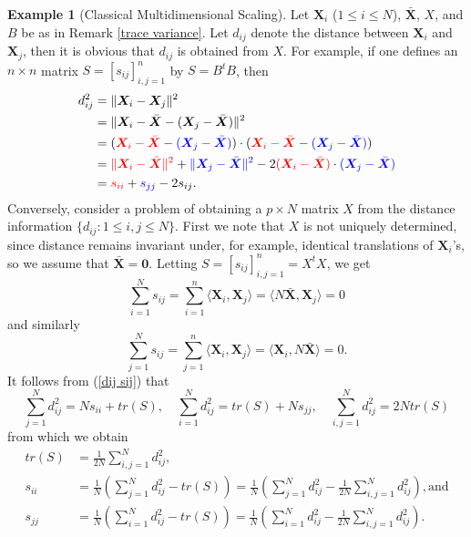 \documentclass[12pt,letterpaper]{book}
\def\red{\textcolor{red}}
\def\blue{\textcolor{blue}}
\numberwithin{equation}{section}
\theoremstyle{definition}
\newtheorem{example}[thm]{\textbf{Example}}
\begin{document}
\begin{example}[Classical Multidimensional Scaling]
Let $\bm{X}_i$ ($1\leq i \leq N$), $\bar{\bm{X}}$, $X$, and $B$ be as in Remark \ref{trace variance}. Let $d_{ij}$ denote the distance between $\bm{X}_i$ and $\bm{X}_j$, then it is obvious that $d_{ij}$ is obtained from $X$. For example, if one defines an $n\times n$ matrix $S=[s_{ij}]_{i,j=1}^n$ by $S=B^tB$, then
\begin{equation}\label{dij sij}
\begin{aligned}d_{ij}^2&=\|\bm{X}_i-\bm{X}_j\|^2\\
&=\|\bm{X}_i-\bar{\bm{X}}-(\bm{X}_j-\bar{\bm{X}})\|^2\\
&=(\red{\bm{X}_i-\bar{\bm{X}}}-\blue{(\bm{X}_j-\bar{\bm{X}})})\cdot (\red{\bm{X}_i-\bar{\bm{X}}}-\blue{(\bm{X}_j-\bar{\bm{X}})})\\
&=\red{\|\bm{X}_i-\bar{\bm{X}}\|^2}+\blue{\|\bm{X}_j-\bar{\bm{X}}\|^2}-2\red{(\bm{X}_i-\bar{\bm{X}})}\cdot \blue{(\bm{X}_j-\bar{\bm{X}})}\\
&=\red{s_{ii}}+\blue{s_{jj}}-2s_{ij}.
\end{aligned}
\end{equation}
Conversely, consider a problem of obtaining a $p\times N$ matrix $X$ from the distance information $\{d_{ij}:1\leq i,j\leq N\}$. First we note that $X$ is not uniquely determined, since distance remains invariant under, for example, identical translations of $\bm{X}_i$'s,  so we assume that $\bar{\bm{X}}=\bm{0}$. Letting $S=[s_{ij}]_{i,j=1}^n=X^tX$, we get
$$\sum_{i=1}^N s_{ij}=\sum_{i=1}^n \langle \bm{X}_i, \bm{X}_j \rangle = \langle N\bar{\bm{X}},\bm{X}_j \rangle=0$$
and similarly
$$\sum_{j=1}^N s_{ij}=\sum_{j=1}^n \langle \bm{X}_i, \bm{X}_j \rangle = \langle \bm{X}_i, N\bar{\bm{X}} \rangle=0.$$
It follows from (\ref{dij sij}) that
$$\sum_{j=1}^N d_{ij}^2=Ns_{ii}+tr(S), \quad\sum_{i=1}^N d_{ij}^2=tr(S)+Ns_{jj},\quad \sum_{i,j=1}^N d_{ij}^2=2Ntr(S)$$
from which we obtain
\begin{equation}\label{s in d}
\begin{aligned}
tr(S)&=\frac{1}{2N}\sum_{i,j=1}^N d_{ij}^2,\\
s_{ii}&=\frac{1}{N}\left(\sum_{j=1}^N d_{ij}^2-tr(S)\right)=\frac{1}{N}\left(\sum_{j=1}^N d_{ij}^2-\frac{1}{2N}\sum_{i,j=1}^N d_{ij}^2\right), \text{and} \\
s_{jj}&=\frac{1}{N}\left(\sum_{i=1}^N d_{ij}^2-tr(S)\right)=\frac{1}{N}\left(\sum_{i=1}^N d_{ij}^2-\frac{1}{2N}\sum_{i,j=1}^N d_{ij}^2\right).
\end{aligned}

\end{equation}
\end{example}
\end{document}
